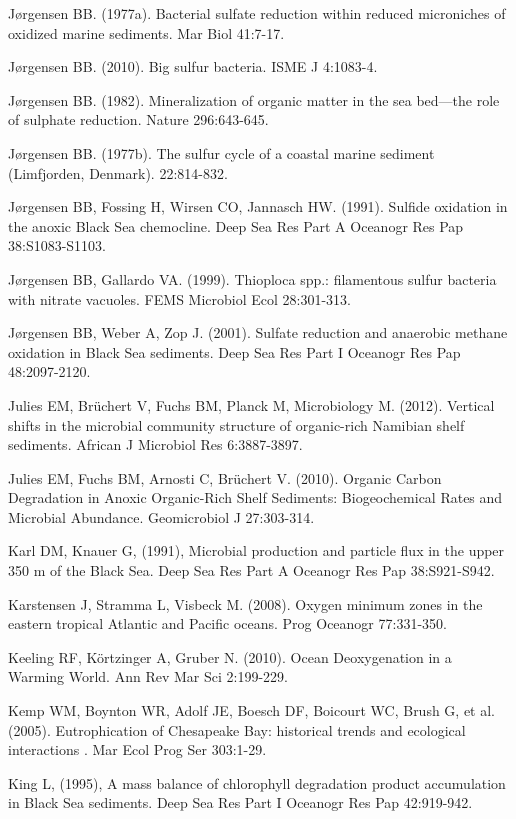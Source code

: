 J{\o}rgensen BB. (1977a). Bacterial sulfate reduction within reduced microniches of oxidized marine sediments. Mar Biol 41:7-17.

J{\o}rgensen BB. (2010). Big sulfur bacteria. ISME J 4:1083-4.

J{\o}rgensen BB. (1982). Mineralization of organic matter in the sea bed—the role of sulphate reduction. Nature 296:643-645.

J{\o}rgensen BB. (1977b). The sulfur cycle of a coastal marine sediment (Limfjorden, Denmark). 22:814-832.

J{\o}rgensen BB, Fossing H, Wirsen CO, Jannasch HW. (1991). Sulfide oxidation in the anoxic Black Sea chemocline. Deep Sea Res Part A Oceanogr Res Pap 38:S1083-S1103.

J{\o}rgensen BB, Gallardo VA. (1999). Thioploca spp.: filamentous sulfur bacteria with nitrate vacuoles. FEMS Microbiol Ecol 28:301-313.

J{\o}rgensen BB, Weber A, Zop J. (2001). Sulfate reduction and anaerobic methane oxidation in Black Sea sediments. Deep Sea Res Part I Oceanogr Res Pap 48:2097-2120.

Julies EM, Br\"uchert V, Fuchs BM, Planck M, Microbiology M. (2012). Vertical shifts in the microbial community structure of organic-rich Namibian shelf sediments. African J Microbiol Res 6:3887-3897.

Julies EM, Fuchs BM, Arnosti C, Br\"uchert V. (2010). Organic Carbon Degradation in Anoxic Organic-Rich Shelf Sediments: Biogeochemical Rates and Microbial Abundance. Geomicrobiol J 27:303-314.

Karl DM, Knauer G, (1991), Microbial production and particle flux in the upper 350 m of the Black Sea. Deep Sea Res Part A Oceanogr Res Pap 38:S921-S942.

Karstensen J, Stramma L, Visbeck M. (2008). Oxygen minimum zones in the eastern tropical Atlantic and Pacific oceans. Prog Oceanogr 77:331-350.

Keeling RF, K\"ortzinger A, Gruber N. (2010). Ocean Deoxygenation in a Warming World. Ann Rev Mar Sci 2:199-229.

Kemp WM, Boynton WR, Adolf JE, Boesch DF, Boicourt WC, Brush G, et al. (2005). Eutrophication of Chesapeake Bay: historical trends and ecological interactions . Mar Ecol Prog Ser 303:1-29.

King L, (1995), A mass balance of chlorophyll degradation product accumulation in Black Sea sediments. Deep Sea Res Part I Oceanogr Res Pap 42:919-942.

